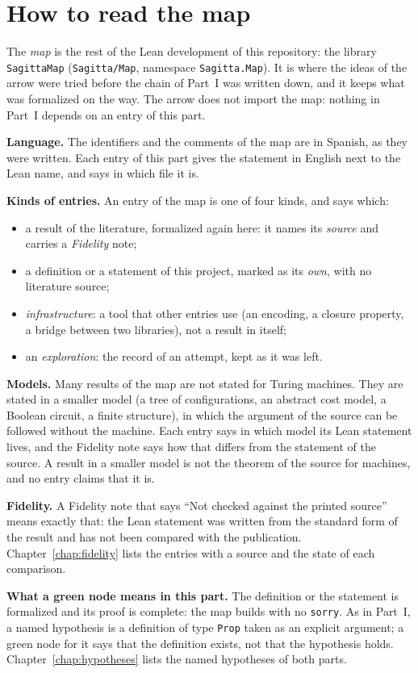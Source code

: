 \chapter{How to read the map}
\label{chap:reading}

The \emph{map} is the rest of the Lean development of this repository: the library
\texttt{SagittaMap} (\texttt{Sagitta/Map}, namespace \texttt{Sagitta.Map}). It is where the ideas
of the arrow were tried before the chain of Part~I was written down, and it keeps what was
formalized on the way. The arrow does not import the map: nothing in Part~I depends on an entry of
this part.

\textbf{Language.} The identifiers and the comments of the map are in Spanish, as they were
written. Each entry of this part gives the statement in English next to the Lean name, and says in
which file it is.

\textbf{Kinds of entries.} An entry of the map is one of four kinds, and says which:
\begin{itemize}
  \item a result of the literature, formalized again here: it names its \emph{source} and carries a
    \emph{Fidelity} note;
  \item a definition or a statement of this project, marked as its \emph{own}, with no literature
    source;
  \item \emph{infrastructure}: a tool that other entries use (an encoding, a closure property, a
    bridge between two libraries), not a result in itself;
  \item an \emph{exploration}: the record of an attempt, kept as it was left.
\end{itemize}

\textbf{Models.} Many results of the map are not stated for Turing machines. They are stated in a
smaller model (a tree of configurations, an abstract cost model, a Boolean circuit, a finite
structure), in which the argument of the source can be followed without the machine. Each entry
says in which model its Lean statement lives, and the Fidelity note says how that differs from the
statement of the source. A result in a smaller model is not the theorem of the source for
machines, and no entry claims that it is.

\textbf{Fidelity.} A Fidelity note that says ``Not checked against the printed source'' means
exactly that: the Lean statement was written from the standard form of the result and has not been
compared with the publication. Chapter~\ref{chap:fidelity} lists the entries with a source and the
state of each comparison.

\textbf{What a green node means in this part.} The definition or the statement is formalized and
its proof is complete: the map builds with no \texttt{sorry}. As in Part~I, a named hypothesis is a
definition of type \texttt{Prop} taken as an explicit argument; a green node for it says that the
definition exists, not that the hypothesis holds. Chapter~\ref{chap:hypotheses} lists the named
hypotheses of both parts.
